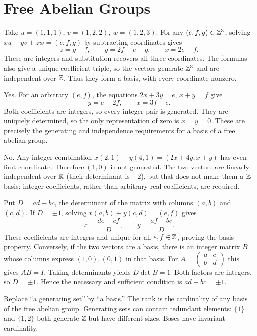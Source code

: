 \section{Free Abelian Groups}

Take $u=(1,1,1)$, $v=(1,2,2)$, $w=(1,2,3)$.
For any $(e,f,g)\in\mathbb{Z}^3$, solving $xu+yv+zw=(e,f,g)$ by subtracting coordinates gives
\[
z=g-f,\qquad y=2f-e-g,\qquad x=2e-f.
\]
These are integers and substitution recovers all three coordinates. The formulas also give a unique coefficient triple, so the vectors generate $\mathbb{Z}^3$ and are independent over $\mathbb{Z}$. Thus they form a basis, with every coordinate nonzero.

Yes. For an arbitrary $(e,f)$, the equations $2x+3y=e$, $x+y=f$ give
\[
y=e-2f,\qquad x=3f-e.
\]
Both coefficients are integers, so every integer pair is generated. They are uniquely determined, so the only representation of zero is $x=y=0$. These are precisely the generating and independence requirements for a basis of a free abelian group.

No. Any integer combination $x(2,1)+y(4,1)=(2x+4y,x+y)$ has even first coordinate. Therefore $(1,0)$ is not generated.
The two vectors are linearly independent over $\mathbb{R}$ (their determinant is $-2$), but that does not make them a $\mathbb{Z}$-basis: integer coefficients, rather than arbitrary real coefficients, are required.

Put $D=ad-bc$, the determinant of the matrix with columns $(a,b)$ and $(c,d)$.
If $D=\pm1$, solving $x(a,b)+y(c,d)=(e,f)$ gives
\[
x=\frac{de-cf}{D},\qquad y=\frac{af-be}{D}.
\]
These coefficients are integers and unique for all $e,f\in\mathbb{Z}$, proving the basis property.
Conversely, if the two vectors are a basis, there is an integer matrix $B$ whose columns express $(1,0),(0,1)$ in that basis. For $A=\begin{pmatrix}a&c\\b&d\end{pmatrix}$ this gives $AB=I$.
Taking determinants yields $D\det B=1$. Both factors are integers, so $D=\pm1$.
Hence the necessary and sufficient condition is $ad-bc=\pm1$.

Replace ``a generating set'' by ``a basis.'' The rank is the cardinality of any basis of the free abelian group. Generating sets can contain redundant elements: $\{1\}$ and $\{1,2\}$ both generate $\mathbb{Z}$ but have different sizes. Bases have invariant cardinality.

